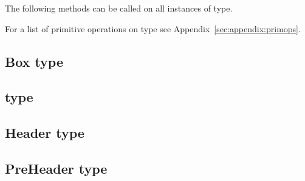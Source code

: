 The following methods can be called on all instances of  type.



For a list of primitive operations on  type see Appendix~\ref{sec:appendix:primops}.

\subsection{Box type}
\label{sec:type:Box}


\subsection{ type}
\label{sec:type:AvlTree}




\subsection{Header type}
\label{sec:type:Header}


\subsection{PreHeader type}
\label{sec:type:PreHeader}


